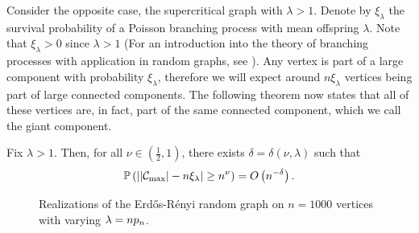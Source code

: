 \bigskip

Consider the opposite case, the supercritical graph with $\lambda > 1$.
Denote by $\xi_\lambda$ the survival probability of a Poisson branching process with mean offspring $\lambda$.
Note that $\xi_\lambda > 0$ since $\lambda > 1$
(For an introduction into the theory of branching processes with application in random graphs, 
see \cite[Chapter 3, p.87ff.]{vanderHofstad.2016}).
Any vertex is part of a large component with probability $\xi_\lambda$, 
therefore we will expect around $n \xi_\lambda$ vertices being part of large connected components.
The following theorem now states that all of these vertices are, in fact, part of the same connected component, which we call the giant component.

\begin{theorem}
	Fix $\lambda>1$.
	Then, for all $\nu \in (\frac{1}{2}, 1)$, there exists $\delta = \delta(\nu, \lambda)$ such that
	\begin{equation*}
		\mathbb{P}\left( \left| |\mathcal{C}_{\max}| - n \xi_\lambda \right| \geq n^{\nu}\right) = O\left(n^{-\delta}\right).
	\end{equation*}
\end{theorem}

\begin{figure}[h]
	\centering
	\quad
	\caption{Realizations of the Erd\H{o}s-Rényi random graph on $n=1000$ vertices with varying $\lambda = n p_n$.}%
	\label{F: ER lambda}%
\end{figure}

